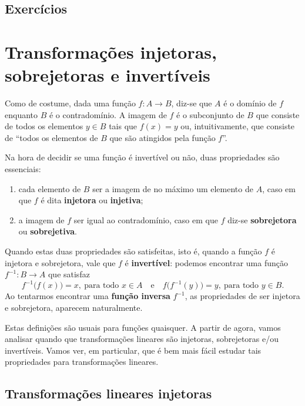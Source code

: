 \documentclass[../livro.tex]{subfiles}
\begin{document}
\subsection*{Exercícios}

\construirExer


\section{Transformações injetoras, sobrejetoras e invertíveis}


Como de costume, dada uma função $f: A \to B$, diz-se que $A$ é o domínio de $f$ enquanto $B$ é o contradomínio. A imagem de $f$ é o subconjunto de $B$ que consiste de todos os elementos $y \in B$ tais que $f(x) = y$ ou, intuitivamente, que consiste de ``todos os elementos de $B$ que são atingidos pela função $f$''.

Na hora de decidir se uma função é invertível ou não, duas propriedades são essenciais:
\begin{enumerate}[$1)$]
  \item cada elemento de $B$ ser a imagem de no máximo um elemento de $A$, caso em que $f$ é dita \textbf{injetora} ou \textbf{injetiva};
  \item a imagem de $f$ ser igual ao contradomínio, caso em que $f$ diz-se \textbf{sobrejetora} ou \textbf{sobrejetiva}.
\end{enumerate}

Quando estas duas propriedades são satisfeitas, isto é, quando a função $f$ é injetora e sobrejetora, vale que $f$ é \textbf{invertível}: podemos encontrar uma função $f^{-1} : B \to A$ que satisfaz
\begin{equation}
f^{-1}\big( f (x)\big) = x, \ \text{para todo } x \in A  \quad \text{e} \quad f\big( f^{-1} (y)\big) = y, \ \text{para todo } y \in B.
\end{equation} Ao tentarmos encontrar uma \textbf{função inversa} $f^{-1}$, as propriedades de ser injetora e sobrejetora, aparecem naturalmente.

Estas definições são usuais para funções quaisquer. A partir de agora, vamos analisar quando que transformações lineares são injetoras, sobrejetoras e/ou invertíveis. Vamos ver, em particular, que é bem mais fácil estudar tais propriedades para transformações lineares.

\subsection{Transformações lineares injetoras}
\end{document}
